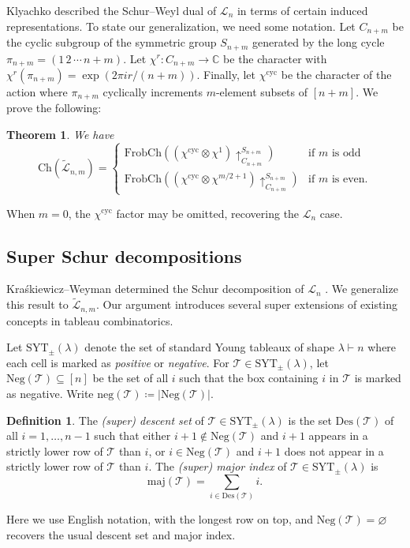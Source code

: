 \documentclass[11pt]{article}
\newtheorem{thm}[theo]{Theorem}
\theoremstyle{definition}
\newtheorem{defi}[theo]{Definition}
\numberwithin{equation}{section}
\newcommand\CC{\mathbb{C}}
\newcommand\Des{\mathrm{Des}}
\newcommand\maj{\mathrm{maj}}
\newcommand\Neg{\mathrm{Neg}}
\newcommand\negg{\mathrm{neg}}
\newcommand\SYT{\mathrm{SYT}}
\newcommand\Lcal{\mathcal{L}}
\newcommand\Ltil{\widetilde{\mathcal{L}}}
\newcommand\Ch{\mathrm{Ch}}
\newcommand\FrobCh{\mathrm{FrobCh}}
\begin{document}
Klyachko \cite{Kly} described the Schur--Weyl dual of $\Lcal_n$ in terms of certain induced representations. To state our generalization, we need some notation. Let $C_{n+m}$ be the cyclic subgroup of the symmetric group $S_{n+m}$ generated by the long cycle $\pi_{n+m} = (1\,2\,\cdots\,n+m)$. Let $\chi^r \colon C_{n+m} \to \CC$ be the character with $\chi^r(\pi_{n+m}) = \exp(2\pi ir/(n+m))$. Finally, let $\chi^\mathrm{cyc}$ be the character of the action where $\pi_{n+m}$ cyclically increments $m$-element subsets of $[n+m]$. We prove the following: 
\begin{thm}\label{thm:super-induced}
We have
\begin{equation}
    \Ch(\Ltil_{n,m}) =
    \begin{cases}
        \FrobCh((\chi^\mathrm{cyc} \otimes \chi^1)\uparrow_{C_{n+m}}^{S_{n+m}}) & \text{if $m$ is odd} \\
        \FrobCh((\chi^\mathrm{cyc} \otimes \chi^{m/2+1})\uparrow_{C_{n+m}}^{S_{n+m}}) & \text{if $m$ is even.}
    \end{cases}
\end{equation}
\end{thm}
When $m=0$, the $\chi^\mathrm{cyc}$ factor may be omitted, recovering the $\Lcal_n$ case.

\subsection{Super Schur decompositions}

Kra{\'s}kiewicz--Weyman determined the Schur decomposition of $\Lcal_n$ \cite{KW}. We generalize this result to $\widetilde{\Lcal}_{n,m}$. Our argument introduces several super extensions of existing concepts in tableau combinatorics.

Let $\SYT_\pm(\lambda)$ denote the set of standard Young tableaux of shape $\lambda \vdash n$ where each cell is marked as \textit{positive} or \textit{negative}. For $\mathcal{T} \in \SYT_\pm(\lambda)$, let $\Neg(\mathcal{T}) \subseteq [n]$ be the set of all $i$ such that the box containing $i$ in $\mathcal{T}$ is marked as negative. Write $\negg(\mathcal{T}) \coloneqq |\Neg(\mathcal{T})|$.
\begin{defi}
    The \textit{(super) descent set} of $\mathcal{T} \in \SYT_\pm(\lambda)$ is the set $\Des(\mathcal{T})$ of all $i=1, \ldots, n-1$ such that either $i+1 \not\in \Neg(\mathcal{T})$ and $i+1$ appears in a strictly lower row of $\mathcal{T}$ than $i$, or $i \in \Neg(\mathcal{T})$ and $i+1$ does not appear in a strictly lower row of $\mathcal{T}$ than $i$. The \textit{(super) major index} of $\mathcal{T} \in \SYT_\pm(\lambda)$ is
\begin{equation}\label{eq:super-maj}
    \maj(\mathcal{T}) = \sum_{i \in \Des(\mathcal{T})} i.
\end{equation}
\end{defi}
Here we use English notation, with the longest row on top, and $\Neg(\mathcal{T}) = \varnothing$ recovers the usual descent set and major index. 
\end{document}
